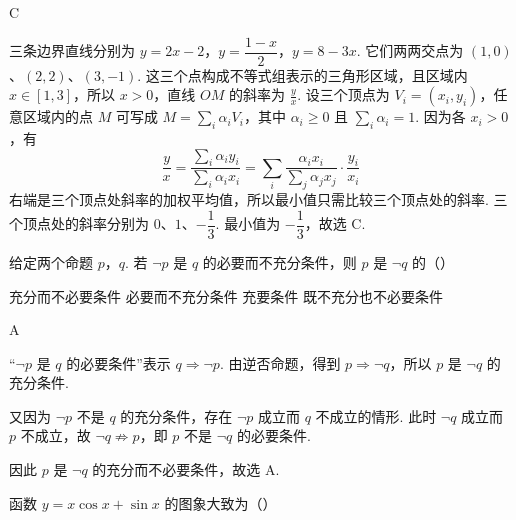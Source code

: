 \begin{answer}
C
\end{answer}

\begin{solution}
三条边界直线分别为 \(y=2x-2\)，\(y=\dfrac{1-x}{2}\)，\(y=8-3x\).
它们两两交点为 \((1,0)\)、\((2,2)\)、\((3,-1)\).
这三个点构成不等式组表示的三角形区域，且区域内 \(x\in[1,3]\)，所以 \(x>0\)，直线 \(OM\) 的斜率为 \(\frac{y}{x}\). 设三个顶点为 \(V_i=(x_i,y_i)\)，任意区域内的点 \(M\) 可写成 \(M=\sum_i\alpha_iV_i\)，其中 \(\alpha_i\geqslant0\) 且 \(\sum_i\alpha_i=1\). 因为各 \(x_i>0\)，有
\[
\frac{y}{x}=\frac{\sum_i\alpha_i y_i}{\sum_i\alpha_i x_i}=\sum_i\frac{\alpha_i x_i}{\sum_j\alpha_j x_j}\cdot\frac{y_i}{x_i}
\]
右端是三个顶点处斜率的加权平均值，所以最小值只需比较三个顶点处的斜率.
三个顶点处的斜率分别为 \(0\)、\(1\)、\(-\dfrac{1}{3}\).
最小值为 \(-\dfrac{1}{3}\)，故选 C.
\end{solution}

\begin{problem}
给定两个命题 \(p\)，\(q\). 若 \(\neg p\) 是 \(q\) 的必要而不充分条件，则 \(p\) 是 \(\neg q\) 的（\quad）

\choices
    {充分而不必要条件}
    {必要而不充分条件}
    {充要条件}
    {既不充分也不必要条件}
\end{problem}

\begin{answer}
A
\end{answer}

\begin{solution}
“\(\neg p\) 是 \(q\) 的必要条件”表示 \(q\Rightarrow\neg p\). 由逆否命题，得到 \(p\Rightarrow\neg q\)，所以 \(p\) 是 \(\neg q\) 的充分条件.

又因为 \(\neg p\) 不是 \(q\) 的充分条件，存在 \(\neg p\) 成立而 \(q\) 不成立的情形. 此时 \(\neg q\) 成立而 \(p\) 不成立，故 \(\neg q\not\Rightarrow p\)，即 \(p\) 不是 \(\neg q\) 的必要条件.

因此 \(p\) 是 \(\neg q\) 的充分而不必要条件，故选 A.
\end{solution}

\begin{problem}
函数 \(y = x \cos x + \sin x\) 的图象大致为（\quad）

    {}
    {}
    {}
\end{problem}


